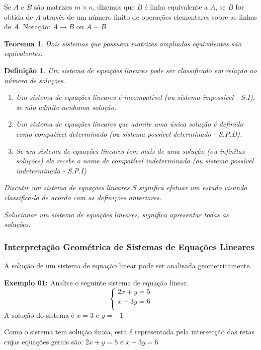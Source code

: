 \documentclass[oneside,a4paper,12pt]{article}
\newtheorem{theorem}{Teorema}[section]
\newtheorem{definition}{Definição}[section]
\begin{document}
Se $A$ e $B$ são matrizes $m \times n$, dizemos que $B$ é linha equivalente a $A$, se $B$ for obtida de $A$ através de um número finito de operações elementares sobre as linhas de $A$. Notação: $A \rightarrow B$ ou $A \sim B$

\begin{theorem}
	Dois sistemas que possuem matrizes ampliadas equivalentes são equivalentes.
\end{theorem}

\begin{definition}
	Um sistema de equações lineares pode ser classificado em relação ao número de soluções.
	\begin{enumerate}
		\item Um sistema de equações lineares é incompatível (ou sistema impossível - S.I), se não admite nenhuma solução.
		\item Um sistema de equações lineares que admite uma única solução é definido como compatível determinado (ou sistema possível determinado - S.P.D).
		\item Se um sistema de equações lineares tem mais de uma solução (ou infinitas soluções) ele recebe o nome de compatível indeterminado (ou sistema possível indeterminado - S.P.I)
	\end{enumerate}

	Discutir um sistema de equações lineares $S$ significa efetuar um estudo visando classificá-lo de acordo com as definições anteriores.
	
	Solucionar um sistema de equações lineares, significa apresentar todas as soluções.
\end{definition}

\subsubsection{Interpretação Geométrica de Sistemas de Equações Lineares}

A solução de um sistema de equação linear pode ser analisada geometricamente.

\textbf{Exemplo 01: }
Analise o seguinte sistema de equação linear.
$$
\left\{
\begin{array}{c}
2x + y = 5 \\
x - 3y = 6 \\
\end{array}
\right.
$$
A solução do sistema é $x = 3$ e $y = -1$

Como o sistema tem solução única, esta é representada pela intersecção das retas cujas equações gerais são:
$2x+y = 5$ e $x-3y = 6$
\end{document}
